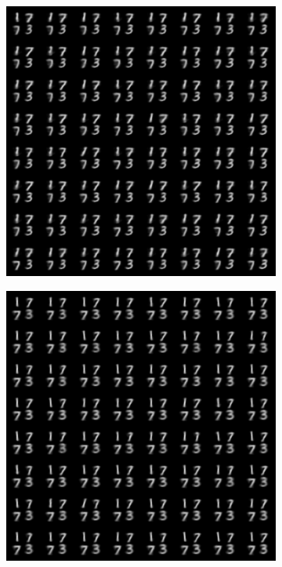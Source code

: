 \documentclass{article}
\begin{document}
\begin{figure}[!h]
\begin{subfigure}[b]{.24\linewidth}
        \caption{}
    \end{subfigure}
    \begin{subfigure}[b]{.24\linewidth}
        \centering
        \includegraphics[width=\linewidth]{multimnist_mmvae_condition_text_1773_image_sample.png}
        \caption{}
    \end{subfigure}
    \begin{subfigure}[b]{.24\linewidth}
        \centering
        \includegraphics[width=\linewidth]{multimnist_mmvae_condition_on_image_1773_image_sample.png}
        \caption{}
    \end{subfigure}


\end{figure}
\end{document}
